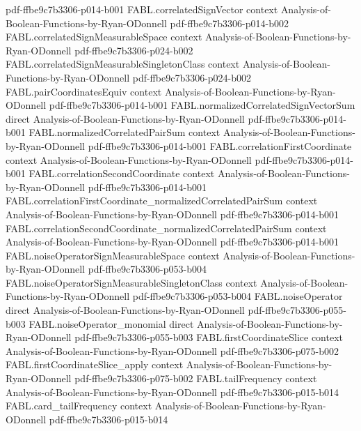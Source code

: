 \begin{theorem}
  {pdf-ffbe9c7b3306-p014-b001}
\proofstep
  {FABL.correlatedSignVector}
  {context}
  {Analysis-of-Boolean-Functions-by-Ryan-ODonnell}
  {pdf-ffbe9c7b3306-p014-b002}
\proofstep
  {FABL.correlatedSignMeasurableSpace}
  {context}
  {Analysis-of-Boolean-Functions-by-Ryan-ODonnell}
  {pdf-ffbe9c7b3306-p024-b002}
\proofstep
  {FABL.correlatedSignMeasurableSingletonClass}
  {context}
  {Analysis-of-Boolean-Functions-by-Ryan-ODonnell}
  {pdf-ffbe9c7b3306-p024-b002}
\proofstep
  {FABL.pairCoordinatesEquiv}
  {context}
  {Analysis-of-Boolean-Functions-by-Ryan-ODonnell}
  {pdf-ffbe9c7b3306-p014-b001}
\proofstep
  {FABL.normalizedCorrelatedSignVectorSum}
  {direct}
  {Analysis-of-Boolean-Functions-by-Ryan-ODonnell}
  {pdf-ffbe9c7b3306-p014-b001}
\proofstep
  {FABL.normalizedCorrelatedPairSum}
  {context}
  {Analysis-of-Boolean-Functions-by-Ryan-ODonnell}
  {pdf-ffbe9c7b3306-p014-b001}
\proofstep
  {FABL.correlationFirstCoordinate}
  {context}
  {Analysis-of-Boolean-Functions-by-Ryan-ODonnell}
  {pdf-ffbe9c7b3306-p014-b001}
\proofstep
  {FABL.correlationSecondCoordinate}
  {context}
  {Analysis-of-Boolean-Functions-by-Ryan-ODonnell}
  {pdf-ffbe9c7b3306-p014-b001}
\proofstep
  {FABL.correlationFirstCoordinate_normalizedCorrelatedPairSum}
  {context}
  {Analysis-of-Boolean-Functions-by-Ryan-ODonnell}
  {pdf-ffbe9c7b3306-p014-b001}
\proofstep
  {FABL.correlationSecondCoordinate_normalizedCorrelatedPairSum}
  {context}
  {Analysis-of-Boolean-Functions-by-Ryan-ODonnell}
  {pdf-ffbe9c7b3306-p014-b001}
\proofstep
  {FABL.noiseOperatorSignMeasurableSpace}
  {context}
  {Analysis-of-Boolean-Functions-by-Ryan-ODonnell}
  {pdf-ffbe9c7b3306-p053-b004}
\proofstep
  {FABL.noiseOperatorSignMeasurableSingletonClass}
  {context}
  {Analysis-of-Boolean-Functions-by-Ryan-ODonnell}
  {pdf-ffbe9c7b3306-p053-b004}
\proofstep
  {FABL.noiseOperator}
  {direct}
  {Analysis-of-Boolean-Functions-by-Ryan-ODonnell}
  {pdf-ffbe9c7b3306-p055-b003}
\proofstep
  {FABL.noiseOperator_monomial}
  {direct}
  {Analysis-of-Boolean-Functions-by-Ryan-ODonnell}
  {pdf-ffbe9c7b3306-p055-b003}
\proofstep
  {FABL.firstCoordinateSlice}
  {context}
  {Analysis-of-Boolean-Functions-by-Ryan-ODonnell}
  {pdf-ffbe9c7b3306-p075-b002}
\proofstep
  {FABL.firstCoordinateSlice_apply}
  {context}
  {Analysis-of-Boolean-Functions-by-Ryan-ODonnell}
  {pdf-ffbe9c7b3306-p075-b002}
\proofstep
  {FABL.tailFrequency}
  {context}
  {Analysis-of-Boolean-Functions-by-Ryan-ODonnell}
  {pdf-ffbe9c7b3306-p015-b014}
\proofstep
  {FABL.card_tailFrequency}
  {context}
  {Analysis-of-Boolean-Functions-by-Ryan-ODonnell}
  {pdf-ffbe9c7b3306-p015-b014}

\end{theorem}
